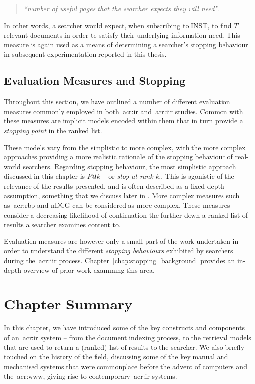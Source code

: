 \begin{quote}
    \emph{``number of useful pages that the searcher expects they will need''.}
\end{quote}

In other words, a searcher would expect, when subscribing to INST, to find $T$ relevant documents in order to satisfy their underlying information need. This measure is again used as a means of determining a searcher's stopping behaviour in subsequent experimentation reported in this thesis.

\subsection{Evaluation Measures and Stopping}
Throughout this section, we have outlined a number of different evaluation measures commonly employed in both~\gls{acr:ir} and~\gls{acr:iir} studies. Common with these measures are implicit models encoded within them that in turn provide a \emph{stopping point} in the ranked list.

These models vary from the simplistic to more complex, with the more complex approaches providing a more realistic rationale of the stopping behaviour of real-world searchers. Regarding stopping behaviour, the most simplistic approach discussed in this chapter is $P@k$ -- or \emph{stop at rank $k$.}. This is agonistic of the relevance of the results presented, and is often described as a fixed-depth assumption, something that we discuss later in . More complex measures such as~\gls{acr:rbp} and nDCG can be considered as more complex. These measures consider a decreasing likelihood of continuation the further down a ranked list of results a searcher examines content to.

Evaluation measures are however only a small part of the work undertaken in order to understand the different \emph{stopping behaviours} exhibited by searchers during the~\gls{acr:iir} process. Chapter~\ref{chap:stopping_background} provides an in-depth overview of prior work examining this area.

\section{Chapter Summary}
In this chapter, we have introduced some of the key constructs and components of an~\gls{acr:ir} system -- from the document indexing process, to the retrieval models that are used to return a (ranked) list of results to the searcher. We also briefly touched on the history of the field, discussing some of the key manual and mechanised systems that were commonplace before the advent of computers and the~\gls{acr:www}, giving rise to contemporary~\gls{acr:ir} systems.

